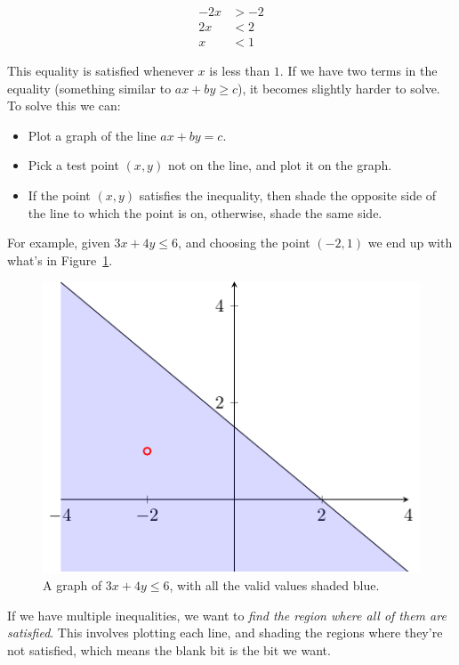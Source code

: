 \[
  \begin{split}
    -2x &> -2\\
    2x &< 2\\
    x &< 1
  \end{split}
\]

This equality is satisfied whenever $x$ is less than $1$. If we have two terms
in the equality (something similar to $ax + by \geq c$), it becomes slightly
harder to solve. To solve this we can:

\begin{itemize}
  \item Plot a graph of the line $ax + by = c$.
  \item Pick a test point $(x, y)$ not on the line, and plot it on the graph.
  \item If the point $(x, y)$ satisfies the inequality, then shade the opposite 
    side of the line to which the point is on, otherwise, shade the same side.
\end{itemize}

For example, given $3x + 4y \leq 6$, and choosing the point $(-2,1)$ we end up
with what's in Figure~\ref{fig:graph-1}.

\begin{figure}[h]
  \centering
  \includegraphics{diagrams/graph1}
  \caption{A graph of $3x + 4y \leq 6$, with all the valid values shaded blue.}
  \label{fig:graph-1}
\end{figure}

If we have multiple inequalities, we want to \textit{find the region where all
of them are satisfied}. This involves plotting each line, and shading the
regions where they're not satisfied, which means the blank bit is the bit we
want.


